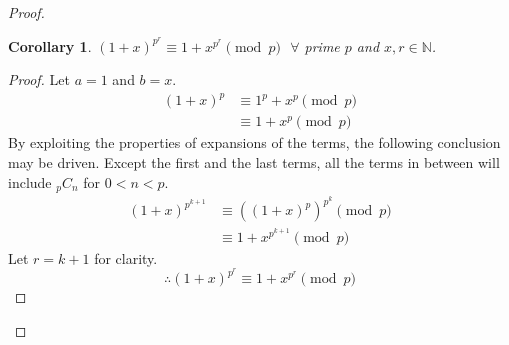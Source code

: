 \documentclass{article}
\newtheorem{corollary}{Corollary}[theorem]
\begin{document}
\begin{proof}
\begin{corollary}
    $(1+x)^{p^r} \equiv 1+x^{p^r} \pmod{p} \text{ }\forall$ prime $p$ and $x,r\in\mathbb{N}$.
\end{corollary}
\begin{proof}
    Let $a=1$ and $b=x$.
    \begin{align*}
        (1+x)^p &\equiv 1^p+x^p \pmod{p} \\
        &\equiv 1+x^p \pmod{p}
    \end{align*}
    By exploiting the properties of expansions of the terms, the following conclusion may be driven. Except the first and the last terms, all the terms in between will include ${}_pC_n$ for $0<n<p$.
    \begin{align*}
        (1+x)^{p^{k+1}} &\equiv \left((1+x)^{p}\right)^{p^k} \pmod{p} \\
        &\equiv 1+x^{p^{k+1}} \pmod{p}
    \end{align*}
    Let $r=k+1$ for clarity.
    \[
    \therefore (1+x)^{p^r} \equiv 1+x^{p^r} \pmod{p}
    \]
\end{proof}


\end{proof}
\end{document}
